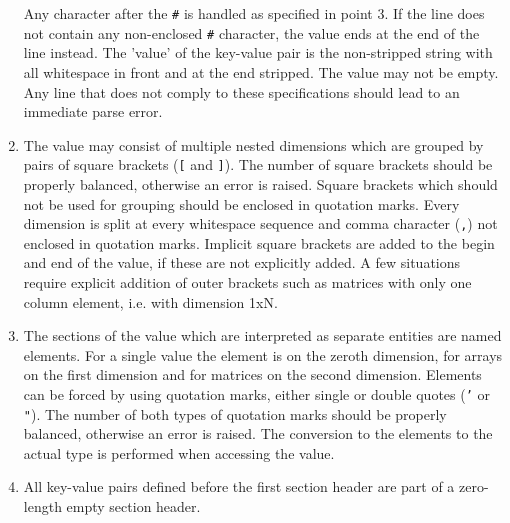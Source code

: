 \begin{enumerate}
Any character after the \texttt{\#} is handled as specified in point 3.
If the line does not contain any non-enclosed \texttt{\#} character, the value ends at the end of the line instead.
The 'value' of the key-value pair is the non-stripped string with all whitespace in front and at the end stripped.
The value may not be empty.
Any line that does not comply to these specifications should lead to an immediate parse error.
\item The value may consist of multiple nested dimensions which are grouped by pairs of square brackets (\texttt{[} and \texttt{]}).
The number of square brackets should be properly balanced, otherwise an error is raised.
Square brackets which should not be used for grouping should be enclosed in quotation marks.
Every dimension is split at every whitespace sequence and comma character (\texttt{,}) not enclosed in quotation marks.
Implicit square brackets are added to the begin and end of the value, if these are not explicitly added.
A few situations require explicit addition of outer brackets such as matrices with only one column element, i.e. with dimension 1xN.
\item The sections of the value which are interpreted as separate entities are named elements.
For a single value the element is on the zeroth dimension, for arrays on the first dimension and for matrices on the second dimension.
Elements can be forced by using quotation marks, either single or double quotes (\texttt{'} or \texttt{"}).
The number of both types of quotation marks should be properly balanced, otherwise an error is raised.
The conversion to the elements to the actual type is performed when accessing the value.
\item All key-value pairs defined before the first section header are part of a zero-length empty section header.
\end{enumerate}

